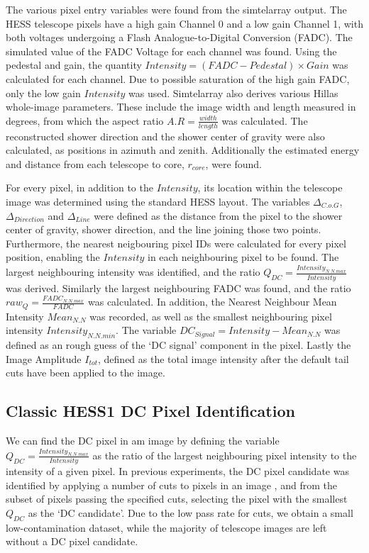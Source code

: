 \documentclass[11pt]{article}
\begin{document}
The various pixel entry variables were found from the sim\textunderscore telarray output. The HESS telescope pixels have a high gain Channel 0 and a low gain Channel 1, with both voltages undergoing a Flash Analogue-to-Digital Conversion (FADC). The simulated value of the FADC Voltage for each channel was found. Using the pedestal and gain, the quantity $Intensity = (FADC - Pedestal)\times Gain $ was calculated for each channel. Due to possible saturation of the high gain FADC, only the low gain $Intensity$ was used. Sim\textunderscore telarray also derives various Hillas whole-image parameters. These include the image width and length measured in degrees, from which the aspect ratio $A.R = \frac{width}{length}$ was calculated. The reconstructed shower direction and the shower center of gravity were also calculated, as positions in azimuth and zenith. Additionally the estimated energy and distance from each telescope to core, $r_{core}$,  were found.

For every pixel, in addition to the $Intensity$, its location within the telescope image was determined using the standard HESS layout. The variables $ \Delta_{C.o.G}$, $\Delta_{Direction}$ and $\Delta_{Line}$ were defined as the distance from the pixel to the shower center of gravity, shower direction, and the line joining those two points. Furthermore, the nearest neigbouring pixel IDs were calculated for every pixel position, enabling the $Intensity$ in each neighbouring pixel to be found. The largest neighbouring intensity was identified, and the ratio $Q_{DC} = \frac{Intensity_{N.N.max}}{Intensity}$ was derived. Similarly the largest neighbouring FADC was found, and the ratio $raw_{Q} = \frac{FADC_{N.N.max}}{FADC}$ was calculated. In addition, the Nearest Neighbour Mean Intensity $Mean_{N.N}$ was recorded, as well as the smallest neighbouring pixel intensity $Intensity_{N.N.min}$. The variable $DC_{Signal} = Intensity-Mean_{N.N}$ was defined as an rough guess of the \textquoteleft DC signal' component in the pixel. Lastly the Image Amplitude $I_{tot}$, defined as the total image intensity after the default tail cuts have been applied to the image.

\subsection{Classic HESS1 DC Pixel Identification}
We can find the DC pixel in am image by defining the variable $Q_{DC} = \frac{Intensity_{N.N.max}}{Intensity}$ as the ratio of the largest neighbouring pixel intensity to the intensity of a given pixel. In previous experiments, the DC pixel candidate was identified by applying a number of cuts to pixels in an image \cite{hess07}, and from the subset of pixels passing the specified cuts, selecting the pixel with the smallest $Q_{DC}$ as the \textquoteleft DC candidate'. Due to the low pass rate for cuts, we obtain a small low-contamination dataset, while the majority of telescope images are left without a DC pixel candidate. 
\end{document}
